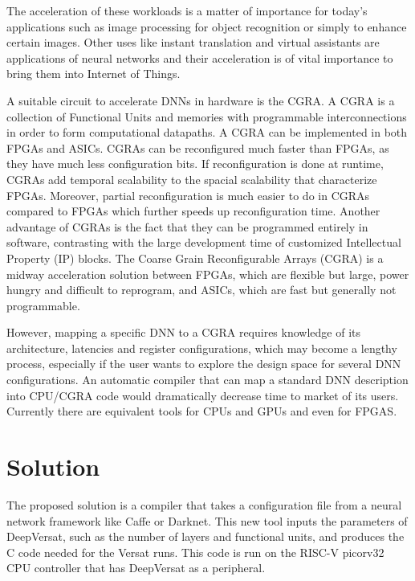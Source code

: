The acceleration of these workloads is a matter of importance for today's
applications such as image processing for object recognition or simply to
enhance certain images. Other uses like instant translation and virtual
assistants are applications of neural networks and their acceleration is of
vital importance to bring them into Internet of Things.

A suitable circuit to accelerate DNNs in hardware is the CGRA. A CGRA is a
collection of Functional Units and memories with programmable interconnections
in order to form computational datapaths. A CGRA can be implemented in both
FPGAs and ASICs. CGRAs can be reconfigured much faster than FPGAs, as they have
much less configuration bits. If reconfiguration is done at runtime, CGRAs add
temporal scalability to the spacial scalability that characterize
FPGAs. Moreover, partial reconfiguration is much easier to do in CGRAs compared
to FPGAs which further speeds up reconfiguration time. Another advantage of
CGRAs is the fact that they can be programmed entirely in software, contrasting
with the large development time of customized Intellectual Property (IP) blocks.
The Coarse Grain Reconfigurable Arrays (CGRA) is a midway acceleration solution
between FPGAs, which are flexible but large, power hungry and difficult to
reprogram, and ASICs, which are fast but generally not programmable.

However, mapping a specific DNN to a CGRA requires knowledge of its
architecture, latencies and register configurations, which may become a lengthy
process, especially if the user wants to explore the design space for several
DNN configurations. An automatic compiler that can map a standard DNN
description into CPU/CGRA code would dramatically decrease time to market of its
users. Currently there are equivalent tools for CPUs and GPUs and
even for FPGAS.


\section{Solution}
\label{section:solution}

The proposed solution is a compiler that takes a configuration file from a
neural network framework like Caffe or Darknet. This new tool inputs the
parameters of DeepVersat, such as the number of layers and functional units,
and produces the C code needed for the Versat runs. This code is run on the
RISC-V picorv32~\cite{picorv} CPU controller that has DeepVersat as a peripheral.

